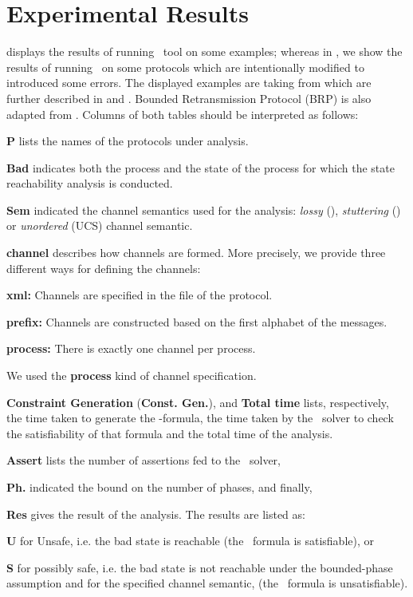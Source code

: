 \section{Experimental Results}

 displays the results of running \MPass\ tool on  some examples;
whereas in , we show the  results of running \MPass\ on some protocols which are intentionally modified to introduced some errors.
The displayed  examples are   taking  from \cite{JRSVgit}  which are further described in \cite{MPSV11} and \cite{RSV11}.
Bounded Retransmission Protocol (BRP) is also adapted from \cite{AABJ04}.
Columns of both tables should be interpreted as follows:

\begin{inparaenum}
\item {\bf P} lists the names of the protocols under analysis.
\item {\bf Bad} indicates both the process and the state of the process for which the state reachability analysis is conducted.
\item {\bf Sem} indicated the channel semantics used for the analysis: \textit{lossy} (\LCS), \textit{stuttering} (\SLCS) or \textit{unordered} (UCS) channel semantic.
\item {\bf channel} describes how channels are formed.  More precisely, we provide three different ways for defining the channels:
\begin{inparaenum}
\item {\bf xml:}  Channels are specified in the \xml file of the protocol.
\item {\bf prefix:} Channels are constructed based on the first alphabet of the messages.
\item {\bf process:} There is exactly one channel per process.
\end{inparaenum}
We used the \textbf{process} kind of channel specification.
\item {\bf Constraint Generation} (\textbf{Const. Gen.}), \textbf{\Smt} and {\bf Total time} lists, respectively, the time taken to generate  the \Smt-formula,
the time taken by the \Smt\ solver to check the satisfiability of that formula and the total time of the analysis.
\item {\bf Assert} lists the number of assertions fed to the \Smt\ solver,
\item {\bf Ph.} indicated the bound on the number of phases, and finally,
\item {\bf Res} gives the result of the analysis. The results are listed as:
\begin{inparaenum}
\item {\bf U} for Unsafe, i.e. the bad state is reachable (the \Smt\ formula is satisfiable), or
\item {\bf S} for possibly safe, i.e. the bad state is not reachable under the bounded-phase assumption and for the specified channel semantic,
(the \Smt\ formula is unsatisfiable).
\end{inparaenum}
\end{inparaenum}

